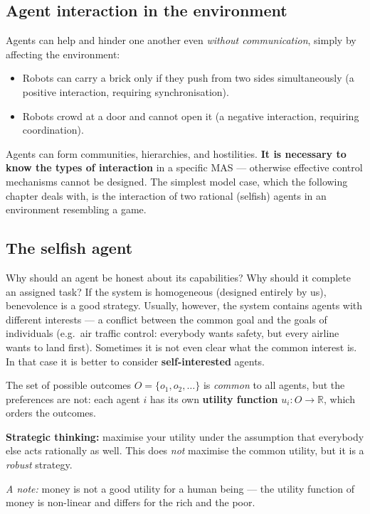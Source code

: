 \documentclass[11pt,a4paper]{article}
\theoremstyle{definition}
\begin{document}
\subsection{Agent interaction in the environment}

Agents can help and hinder one another even \emph{without communication}, simply by affecting the
environment:
\begin{itemize}
\item Robots can carry a brick only if they push from two sides simultaneously (a positive
  interaction, requiring synchronisation).
\item Robots crowd at a door and cannot open it (a negative interaction, requiring coordination).
\end{itemize}
Agents can form communities, hierarchies, and hostilities. \textbf{It is necessary to know the types
of interaction} in a specific MAS --- otherwise effective control mechanisms cannot be designed.
The simplest model case, which the following chapter deals with, is the interaction of two
rational (selfish) agents in an environment resembling a game.
\subsection{The selfish agent}

Why should an agent be honest about its capabilities? Why should it complete an assigned task?
If the system is homogeneous (designed entirely by us), benevolence is a good strategy. Usually,
however, the system contains agents with different interests --- a conflict between the common goal
and the goals of individuals (e.g.\ air traffic control: everybody wants safety, but every airline
wants to land first). Sometimes it is not even clear what the common interest is. In that case it is
better to consider \textbf{self-interested} agents.

\begin{defbox}
The set of possible outcomes $O = \{o_1, o_2, \dots\}$ is \emph{common} to all agents,
but the preferences are not: each agent $i$ has its own \textbf{utility function}
$u_i : O \to \mathbb{R}$, which orders the outcomes.

\textbf{Strategic thinking:} maximise your utility under the assumption that everybody else acts
rationally as well. This does \emph{not} maximise the common utility, but it is a \emph{robust}
strategy.

\emph{A note:} money is not a good utility for a human being --- the utility function of money is
non-linear and differs for the rich and the poor.
\end{defbox}
\end{document}
